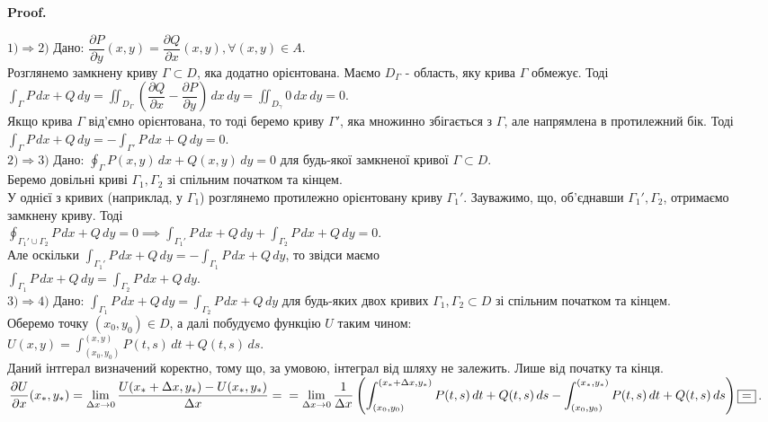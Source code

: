 \documentclass[a4paper, 10pt]{article}
\makeatletter
\def\departial#1#2{\dfrac{\partial {#1}}{\partial {#2}}}
\def\qed{$\blacksquare$}
\theoremstyle{theoremdd}
\theoremstyle{theoremdd}
\theoremstyle{theoremdd}
\theoremstyle{theoremdd}
\theoremstyle{theoremdd}
\theoremstyle{theoremdd}
\theoremstyle{theoremdd}
\theoremstyle{theoremdd}
\theoremstyle{theoremdd}
\theoremstyle{theoremdd}
\theoremstyle{theoremdd}
\theoremstyle{theoremdd}
\theoremstyle{theoremdd}
\theoremstyle{theoremdd}
\theoremstyle{theoremdd}
\renewenvironment{proof}[1][Proof.\\]{\par
\pushQED{\hfill \qed}%
\normalfont \topsep6\p@\@plus6\p@\relax
\trivlist
\item\relax
{\bfseries
#1\@addpunct{.}}\hspace\labelsep\ignorespaces
}{%
\popQED\endtrivlist\@endpefalse
}
\makeatother
\begin{document}
\begin{proof}
$\boxed{1) \Rightarrow 2)}$ Дано: $\departial{P}{y}(x,y) = \departial{Q}{x}(x,y), \forall (x,y) \in A$.\\
Розглянемо замкнену криву $\Gamma \subset D$, яка додатно орієнтована. Маємо $D_{\Gamma}$ - область, яку крива $\Gamma$ обмежує. Тоді\\
$\displaystyle\int_{\Gamma} P\,dx + Q\,dy = \iint_{D_\Gamma} \left( \departial{Q}{x} - \departial{P}{y} \right)\,dx\,dy = \iint_{D_\gamma} 0\,dx\,dy = 0$.\\
Якщо крива $\Gamma$ від'ємно орієнтована, то тоді беремо криву $\Gamma'$, яка множинно збігається з $\Gamma$, але напрямлена в протилежний бік. Тоді\\
$\displaystyle\int_{\Gamma} P\,dx + Q\,dy = -\int_{\Gamma'} P\,dx + Q\,dy = 0$.
\bigskip \\
$\boxed{2) \Rightarrow 3)}$ Дано: $\displaystyle\oint_{\Gamma} P(x,y)\,dx + Q(x,y)\,dy = 0$ для будь-якої замкненої кривої $\Gamma \subset D$.\\
Беремо довільні криві $\Gamma_1,\Gamma_2$ зі спільним початком та кінцем.\\
У однієї з кривих (наприклад, у $\Gamma_1$) розглянемо протилежно орієнтовану криву $\Gamma_1'$. Зауважимо, що, об'єднавши $\Gamma_1', \Gamma_2$, отримаємо замкнену криву. Тоді\\
$\displaystyle\oint_{\Gamma_1' \cup \Gamma_2} P\,dx+Q\,dy = 0 \implies \int_{\Gamma_1'} P\,dx + Q\,dy + \int_{\Gamma_2} P\,dx + Q\,dy = 0$.\\
Але оскільки $\displaystyle \int_{\Gamma_1'} P\,dx + Q\,dy = -\int_{\Gamma_1} P\,dx + Q\,dy$, то звідси маємо\\
$\displaystyle\int_{\Gamma_1} P\,dx + Q\,dy = \int_{\Gamma_2} P\,dx + Q\,dy$.
\bigskip \\
$\boxed{3) \Rightarrow 4)}$ Дано: $\displaystyle\int_{\Gamma_1} P\,dx + Q\,dy = \int_{\Gamma_2} P\,dx + Q\,dy$ для будь-яких двох кривих $\Gamma_1, \Gamma_2 \subset D$ зі спільним початком та кінцем.\\
Оберемо точку $(x_0,y_0) \in D$, а далі побудуємо функцію $U$ таким чином:\\
$U(x,y) = \displaystyle\int_{(x_0,y_0)}^{(x,y)} P(t,s)\,dt + Q(t,s)\,ds$.\\
Даний інтгерал визначений коректно, тому що, за умовою, інтеграл від шляху не залежить. Лише від початку та кінця.\\
$\departial{U}{x}(x_*,y_*) = \displaystyle\lim_{\Delta x \to 0} \dfrac{U(x_*+\Delta x, y_*) - U(x_*,y_*)}{\Delta x} = \\ = \lim_{\Delta x \to 0} \dfrac{1}{\Delta x} \left( \int_{(x_0,y_0)}^{(x_* + \Delta x,y_*)} P(t,s)\,dt + Q(t,s)\,ds -\int_{(x_0,y_0)}^{(x_*,y_*)} P(t,s)\,dt + Q(t,s)\,ds \right) \boxed{=}$.\\

\end{proof}
\end{document}
